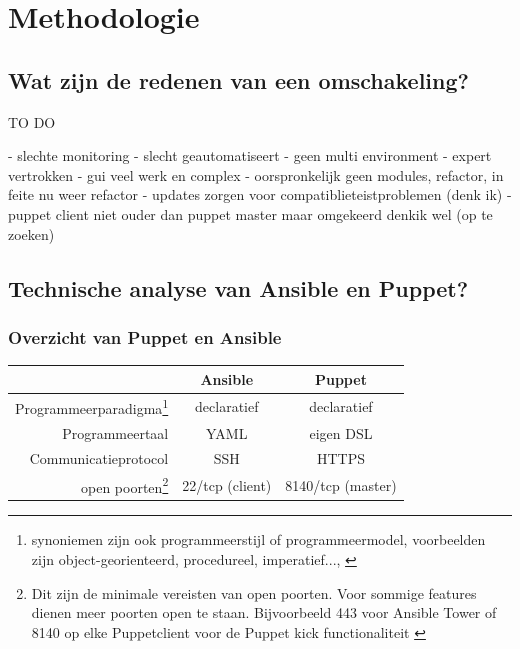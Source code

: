 
\chapter{Methodologie}
\label{ch:methodologie}


\section{Wat zijn de redenen van een omschakeling?}
\label{sec:methodologie-redenen-omschakeling}

TO DO

- slechte monitoring
- slecht geautomatiseert 
- geen multi environment
- expert vertrokken
- gui veel werk en complex
- oorspronkelijk geen modules, refactor, in feite nu weer refactor
- updates zorgen voor compatiblieteistproblemen (denk ik)
- puppet client niet ouder dan puppet master maar omgekeerd denkik wel (op te zoeken)

\section{Technische analyse van Ansible en Puppet?}
\label{sec:methodologie-technische-verschillen}

\subsection{Overzicht van Puppet en Ansible}

\begin{minipage}{15cm}
\begin{tabular}{ r |c c }
& \textbf{Ansible} & \textbf{Puppet} \\
  \hline	  		
Programmeerparadigma\footnote{synoniemen zijn ook programmeerstijl of programmeermodel, voorbeelden zijn object-georienteerd, procedureel, imperatief..., \autocite{journalofinformation} }  & declaratief & declaratief  \\
   \hline
 Programmeertaal & YAML & eigen DSL  \\
     \hline
   Communicatieprotocol & SSH & HTTPS \\
   \hline
   open poorten\footnote{Dit zijn de minimale vereisten van open poorten. Voor sommige features dienen meer poorten open te staan. Bijvoorbeeld 443 voor Ansible Tower of 8140 op elke Puppetclient voor de Puppet kick functionaliteit \autocite{puppetkick} }  & 22/tcp (client) & 8140/tcp (master)\\
  \end{tabular}
  \end{minipage}   



